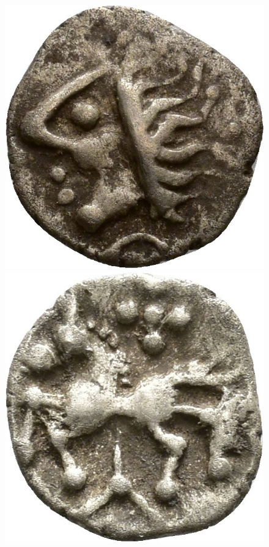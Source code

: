 \documentclass[nolibertine, english, algorithm, nomencl, minted]{ttlab-qualify}
\begin{document}
\begin{figure}[h]
\begin{minipage}{0.25\textwidth}
    \end{minipage}

    \vspace{0.25cm}

    \begin{minipage}{0.25\textwidth}
        \centering
        \includegraphics[width=\linewidth]{static/00016a00.jpg}
    \end{minipage}
    \hfill
    \begin{minipage}{0.25\textwidth}
        \centering
        \includegraphics[width=\linewidth]{static/00016r00.jpg}
    \end{minipage}


\end{figure}
\end{document}
